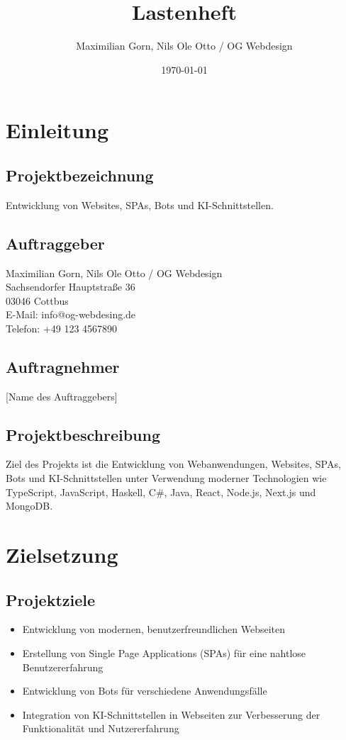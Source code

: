 \documentclass[a4paper,12pt]{article}
\begin{document}
\title{Lastenheft}
\author{Maximilian Gorn, Nils Ole Otto / OG Webdesign}
\date{\today}
\maketitle

\tableofcontents
\newpage

\section{Einleitung}

\subsection{Projektbezeichnung}
Entwicklung von Websites, SPAs, Bots und KI-Schnittstellen.

\subsection{Auftraggeber}
Maximilian Gorn, Nils Ole Otto / OG Webdesign \\
Sachsendorfer Hauptstraße 36 \\
03046 Cottbus \\
E-Mail: info@og-webdesing.de \\
Telefon: +49 123 4567890

\subsection{Auftragnehmer}
[Name des Auftraggebers]

\subsection{Projektbeschreibung}
Ziel des Projekts ist die Entwicklung von Webanwendungen, Websites, SPAs, Bots und KI-Schnittstellen unter Verwendung moderner Technologien wie TypeScript, JavaScript, Haskell, C\#, Java, React, Node.js, Next.js und MongoDB.

\section{Zielsetzung}

\subsection{Projektziele}
\begin{itemize}
    \item Entwicklung von modernen, benutzerfreundlichen Webseiten
    \item Erstellung von Single Page Applications (SPAs) für eine nahtlose Benutzererfahrung
    \item Entwicklung von Bots für verschiedene Anwendungsfälle
    \item Integration von KI-Schnittstellen in Webseiten zur Verbesserung der Funktionalität und Nutzererfahrung
\end{itemize}
\end{document}
